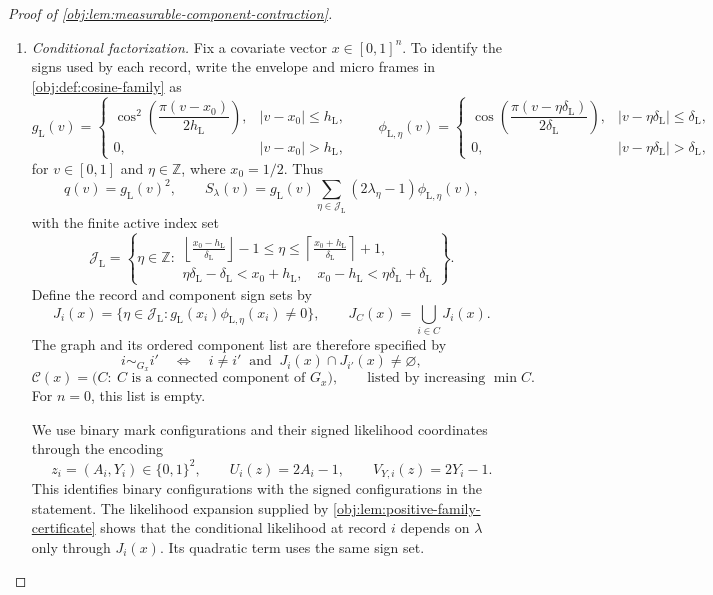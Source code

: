\documentclass[11pt]{article}
\begin{document}
\begin{proof}[Proof of \cref{obj:lem:measurable-component-contraction}]
\begin{enumerate}
\item \textit{Conditional factorization.}
Fix a covariate vector \(x\in[0,1]^n\). To identify the signs used by each record, write the envelope and micro frames in \cref{obj:def:cosine-family} as
\[
g_{\mathrm L}(v)=
\begin{cases}
\cos^2\!\left(\dfrac{\pi(v-x_0)}{2h_{\mathrm L}}\right),
& |v-x_0|\le h_{\mathrm L},\\
0,& |v-x_0|>h_{\mathrm L},
\end{cases}
\qquad
\phi_{\mathrm L,\eta}(v)=
\begin{cases}
\cos\!\left(\dfrac{\pi(v-\eta\delta_{\mathrm L})}{2\delta_{\mathrm L}}\right),
& |v-\eta\delta_{\mathrm L}|\le\delta_{\mathrm L},\\
0,& |v-\eta\delta_{\mathrm L}|>\delta_{\mathrm L},
\end{cases}
\]
for \(v\in[0,1]\) and \(\eta\in\mathbb Z\), where \(x_0=1/2\). Thus
\[
q(v)=g_{\mathrm L}(v)^2,
\qquad
S_\lambda(v)=g_{\mathrm L}(v)
 \sum_{\eta\in\mathcal J_{\mathrm L}}(2\lambda_\eta-1)\phi_{\mathrm L,\eta}(v),
\]
with the finite active index set
\[
\mathcal J_{\mathrm L}
=
\left\{
\eta\in\mathbb Z:
\begin{array}{l}
\displaystyle
\left\lfloor\frac{x_0-h_{\mathrm L}}{\delta_{\mathrm L}}\right\rfloor-1
\le \eta\le
\left\lceil\frac{x_0+h_{\mathrm L}}{\delta_{\mathrm L}}\right\rceil+1,\\
\eta\delta_{\mathrm L}-\delta_{\mathrm L}<x_0+h_{\mathrm L},
\quad
x_0-h_{\mathrm L}<\eta\delta_{\mathrm L}+\delta_{\mathrm L}
\end{array}
\right\}.
\]
Define the record and component sign sets by
\[
J_i(x)=
 \{\eta\in\mathcal J_{\mathrm L}:
   g_{\mathrm L}(x_i)\phi_{\mathrm L,\eta}(x_i)\ne0\},
\qquad
J_C(x)=\bigcup_{i\in C}J_i(x).
\]
The graph and its ordered component list are therefore specified by
\[
i\sim_{G_x}i'
\quad\Longleftrightarrow\quad
i\ne i'\ \text{ and }\ J_i(x)\cap J_{i'}(x)\ne\varnothing,
\]
\[
\mathscr C(x)
=
\bigl(C:\ C\text{ is a connected component of }G_x\bigr),
\qquad
\text{listed by increasing }\min C.
\]
For \(n=0\), this list is empty.

We use binary mark configurations and their signed likelihood coordinates through the encoding
\[
z_i=(A_i,Y_i)\in\{0,1\}^2,
\qquad
U_i(z)=2A_i-1,
\qquad
V_{Y,i}(z)=2Y_i-1.
\]
This identifies binary configurations with the signed configurations in the statement. The likelihood expansion supplied by
\cref{obj:lem:positive-family-certificate} shows that the conditional likelihood at record \(i\) depends on \(\lambda\) only through \(J_i(x)\). Its quadratic term uses the same sign set.


\end{enumerate}
\end{proof}
\end{document}
